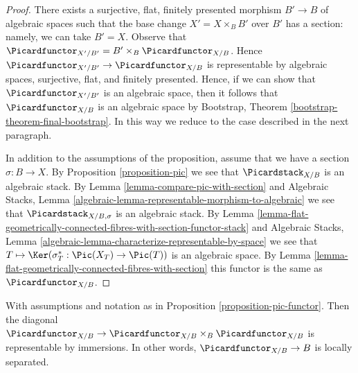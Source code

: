 \begin{proof}
There exists a surjective, flat, finitely presented morphism
$B' \to B$ of algebraic spaces such that the base change $X' = X \times_B B'$
over $B'$ has a section: namely, we can take $B' = X$.
Observe that $\Picardfunctor_{X'/B'} = B' \times_B \Picardfunctor_{X/B}$.
Hence $\Picardfunctor_{X'/B'} \to \Picardfunctor_{X/B}$ is representable
by algebraic spaces, surjective, flat, and finitely presented.
Hence, if we can show that $\Picardfunctor_{X'/B'}$ is an algebraic space,
then it follows that $\Picardfunctor_{X/B}$
is an algebraic space by Bootstrap, Theorem
\ref{bootstrap-theorem-final-bootstrap}.
In this way we reduce to the case described in the next paragraph.

\medskip\noindent
In addition to the assumptions of the proposition, assume that
we have a section $\sigma : B \to X$. By
Proposition \ref{proposition-pic} we see that
$\Picardstack_{X/B}$ is an algebraic stack.
By Lemma \ref{lemma-compare-pic-with-section} and
Algebraic Stacks, Lemma
\ref{algebraic-lemma-representable-morphism-to-algebraic}
we see that $\Picardstack_{X/B, \sigma}$ is an algebraic stack.
By Lemma
\ref{lemma-flat-geometrically-connected-fibres-with-section-functor-stack}
and Algebraic Stacks, Lemma
\ref{algebraic-lemma-characterize-representable-by-space}
we see that $T \mapsto \Ker(\sigma_T^* : \Pic(X_T) \to \Pic(T))$
is an algebraic space.
By Lemma \ref{lemma-flat-geometrically-connected-fibres-with-section}
this functor is the same as $\Picardfunctor_{X/B}$.
\end{proof}

\begin{lemma}
\label{lemma-diagonal-pic}
With assumptions and notation as in Proposition \ref{proposition-pic-functor}.
Then the diagonal
$\Picardfunctor_{X/B} \to \Picardfunctor_{X/B} \times_B \Picardfunctor_{X/B}$
is representable by immersions. In other words, $\Picardfunctor_{X/B} \to B$
is locally separated.
\end{lemma}

